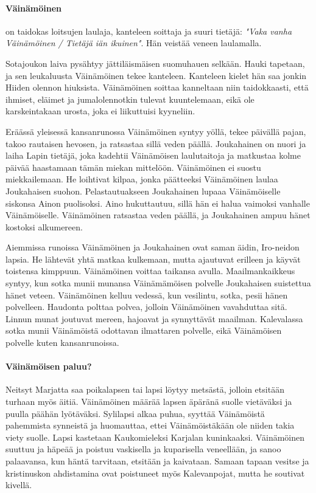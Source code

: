   \paragraph{Väinämöinen} on taidokas loitsujen laulaja, kanteleen soittaja ja suuri tietäjä:
    \emph{"Vaka vanha Väinämöinen / Tietäjä iän ikuinen"}. Hän veistää veneen laulamalla. \par
    Sotajoukon laiva pysähtyy jättiläismäisen suomuhauen selkään. Hauki tapetaan, ja sen
    leukaluusta Väinämöinen tekee kanteleen. Kanteleen kielet hän saa jonkin Hiiden olennon
    hiuksista. Väinämöinen soittaa kanneltaan niin taidokkaasti, että ihmiset, eläimet ja
    jumalolennotkin tulevat kuuntelemaan, eikä ole karskeintakaan urosta, joka ei liikuttuisi
    kyyneliin. \par
    Eräässä yleisessä kansanrunossa Väinämöinen syntyy yöllä, tekee päivällä pajan, takoo
    rautaisen hevosen, ja ratsastaa sillä veden päällä. Joukahainen on nuori ja laiha Lapin
    tietäjä, joka kadehtii Väinämöisen laulutaitoja ja matkustaa kolme päivää haastamaan tämän
    miekan mittelöön. Väinämöinen ei suostu miekkailemaan. He loihtivat kilpaa, jonka päätteeksi
    Väinämöinen laulaa Joukahaisen suohon. Pelastautuakseen Joukahainen lupaaa Väinämöiselle
    siskonsa Ainon puolisoksi. Aino hukuttautuu, sillä hän ei halua vaimoksi vanhalle
    Väinämöiselle. Väinämöinen ratsastaa veden päällä, ja Joukahainen ampuu hänet kostoksi
    alkumereen. \par
    Aiemmissa runoissa Väinämöinen ja Joukahainen ovat saman äidin, Iro-neidon lapsia. He lähtevät
    yhtä matkaa kulkemaan, mutta ajautuvat erilleen ja käyvät toistensa kimppuun. Väinämöinen
    voittaa taikansa avulla. Maailmankaikkeus syntyy, kun sotka munii munansa Väinämämöisen
    polvelle Joukahaisen suistettua hänet veteen. Väinämöinen kelluu vedessä, kun vesilintu, sotka,
    pesii hänen polvelleen. Haudonta polttaa polvea, jolloin Väinämöinen vavahduttaa sitä.
    Linnun munat joutuvat mereen, hajoavat ja synnyttävät maailman. Kalevalassa sotka munii
    Väinämöistä odottavan ilmattaren polvelle, eikä Väinämöisen polvelle kuten kansanrunoissa.
  \paragraph{Väinämöisen paluu?} Neitsyt Marjatta saa poikalapsen tai lapsi löytyy metsästä,
    jolloin etsitään turhaan myös äitiä. Väinämöinen määrää lapsen äpäränä suolle vietäväksi ja
    puulla päähän lyötäväksi. Sylilapsi alkaa puhua, syyttää Väinämöistä pahemmista synneistä
    ja huomauttaa, ettei Väinämöistäkään ole niiden takia viety suolle. Lapsi kastetaan
    Kaukomieleksi Karjalan kuninkaaksi. Väinämöinen suuttuu ja häpeää ja poistuu vaskisella ja
    kuparisella veneellään, ja sanoo palaavansa, kun häntä tarvitaan, etsitään ja kaivataan.
    Samaan tapaan vesitse ja kristinuskon ahdistamina ovat poistuneet myös Kalevanpojat, mutta
    he soutivat kivellä.


